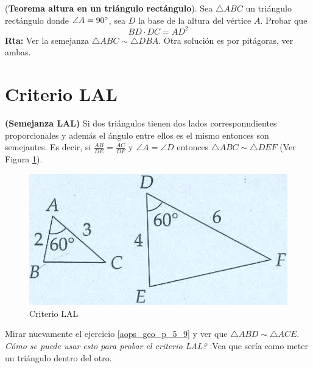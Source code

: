 \begin{ejemplo}
	\label{teorema_altura_en_triangulo_rectangulo}
	(\textbf{Teorema altura en un triángulo rectángulo}). Sea $\triangle ABC$ un triángulo rectángulo donde $\angle A= 90\degree $, sea $D$ la base de la altura del vértice $A$. Probar que
	\[
		BD\cdot DC = {AD}^2
	\]
	\textbf{Rta:} Ver la semejanza $\triangle ABC \sim \triangle DBA$. Otra solución es por pitágoras, ver ambas.
\end{ejemplo}

\section{Criterio LAL}
\begin{theorem} \textbf{(Semejanza LAL)}
	Si dos triángulos tienen dos lados corresponndientes proporcionales y además el ángulo entre ellos es el mismo entonces son semejantes. Es decir, si $\frac{AB}{DE} = \frac{AC}{DF}$ y $\angle A =\angle D$ entonces $\triangle ABC \sim \triangle DEF$ (Ver Figura \ref{aops_geo_criterio_LAL}).
	
	\begin{figure}[H]
		\centering
		\includegraphics[width=0.5\linewidth]{Geometria/imgs/aops_geo_criterio_LAL}
		\caption{Criterio LAL}
		\label{aops_geo_criterio_LAL}
	\end{figure}
\end{theorem}

Mirar nuevamente el ejercicio \ref{aops_geo_p_5_9} y ver que $\triangle ABD \sim \triangle ACE$. \textit{Cómo se puede usar esto para probar el criterio LAL? } :Vea que sería como meter un triángulo dentro del otro.


